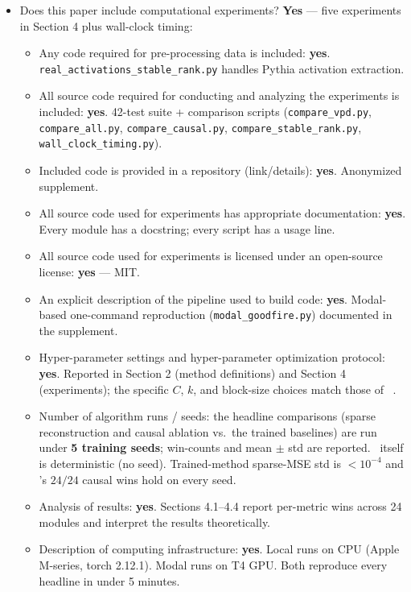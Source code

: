 \documentclass[letterpaper]{article}
\begin{document}
\begin{itemize}
\item Does this paper include computational experiments?
\textbf{Yes} --- five experiments in Section 4 plus wall-clock timing:
\begin{itemize}
\item Any code required for pre-processing data is included: \textbf{yes}. \texttt{real\_activations\_stable\_rank.py} handles Pythia activation extraction.
\item All source code required for conducting and analyzing the experiments is included: \textbf{yes}. 42-test suite + comparison scripts (\texttt{compare\_vpd.py}, \texttt{compare\_all.py}, \texttt{compare\_causal.py}, \texttt{compare\_stable\_rank.py}, \texttt{wall\_clock\_timing.py}).
\item Included code is provided in a repository (link/details): \textbf{yes}. Anonymized supplement.
\item All source code used for experiments has appropriate documentation: \textbf{yes}. Every module has a docstring; every script has a usage line.
\item All source code used for experiments is licensed under an open-source license: \textbf{yes} --- MIT.
\item An explicit description of the pipeline used to build code: \textbf{yes}. Modal-based one-command reproduction (\texttt{modal\_goodfire.py}) documented in the supplement.
\item Hyper-parameter settings and hyper-parameter optimization protocol: \textbf{yes}. Reported in Section 2 (method definitions) and Section 4 (experiments); the specific $C$, $k$, and block-size choices match those of \vpd\ \cite{bushnaq2026vpd}.
\item Number of algorithm runs / seeds: the headline comparisons (sparse reconstruction and causal ablation vs.\ the trained baselines) are run under \textbf{5 training seeds}; win-counts and mean $\pm$ std are reported. \svdomp\ itself is deterministic (no seed). Trained-method sparse-MSE std is ${<}10^{-4}$ and \svdomp's $24/24$ causal wins hold on every seed.
\item Analysis of results: \textbf{yes}. Sections 4.1--4.4 report per-metric wins across 24 modules and interpret the results theoretically.
\item Description of computing infrastructure: \textbf{yes}. Local runs on CPU (Apple M-series, torch 2.12.1). Modal runs on T4 GPU. Both reproduce every headline in under 5 minutes.
\end{itemize}
\end{itemize}
\end{document}
